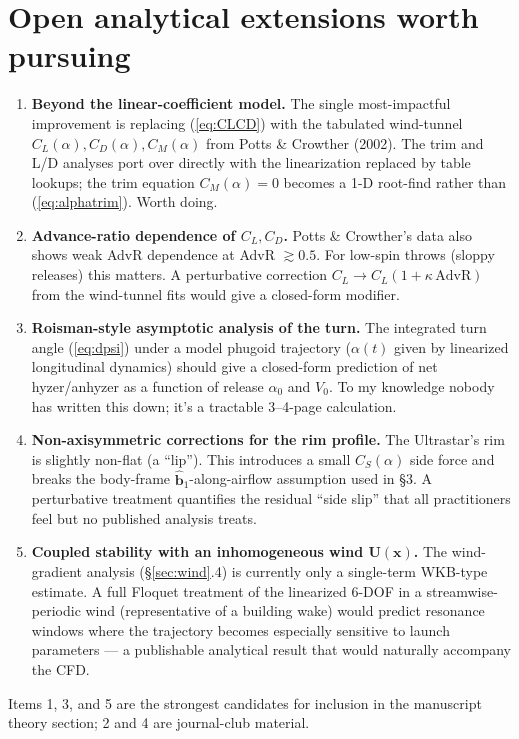 \documentclass[11pt,letterpaper]{article}
\begin{document}
\section{Open analytical extensions worth pursuing}

\begin{enumerate}[leftmargin=*,itemsep=4pt]
  \item \textbf{Beyond the linear-coefficient model.} The single most-impactful improvement is replacing (\ref{eq:CLCD}) with the tabulated wind-tunnel $C_L(\alpha), C_D(\alpha), C_M(\alpha)$ from Potts \& Crowther (2002). The trim and L/D analyses port over directly with the linearization replaced by table lookups; the trim equation $C_M(\alpha) = 0$ becomes a 1-D root-find rather than (\ref{eq:alphatrim}). Worth doing.
  \item \textbf{Advance-ratio dependence of $C_L, C_D$.} Potts \& Crowther's data also shows weak AdvR dependence at AdvR $\gtrsim 0.5$. For low-spin throws (sloppy releases) this matters. A perturbative correction $C_L \to C_L (1 + \kappa\,\mathrm{AdvR})$ from the wind-tunnel fits would give a closed-form modifier.
  \item \textbf{Roisman-style asymptotic analysis of the turn.} The integrated turn angle (\ref{eq:dpsi}) under a model phugoid trajectory ($\alpha(t)$ given by linearized longitudinal dynamics) should give a closed-form prediction of net hyzer/anhyzer as a function of release $\alpha_0$ and $V_0$. To my knowledge nobody has written this down; it's a tractable 3--4-page calculation.
  \item \textbf{Non-axisymmetric corrections for the rim profile.} The Ultrastar's rim is slightly non-flat (a ``lip''). This introduces a small $C_S(\alpha)$ side force and breaks the body-frame $\hat{\mathbf{b}}_1$-along-airflow assumption used in \S3. A perturbative treatment quantifies the residual ``side slip'' that all practitioners feel but no published analysis treats.
  \item \textbf{Coupled stability with an inhomogeneous wind $\mathbf{U}(\mathbf{x})$.} The wind-gradient analysis (\S\ref{sec:wind}.4) is currently only a single-term WKB-type estimate. A full Floquet treatment of the linearized 6-DOF in a streamwise-periodic wind (representative of a building wake) would predict resonance windows where the trajectory becomes especially sensitive to launch parameters --- a publishable analytical result that would naturally accompany the CFD.
\end{enumerate}
Items 1, 3, and 5 are the strongest candidates for inclusion in the manuscript theory section; 2 and 4 are journal-club material.
\end{document}
